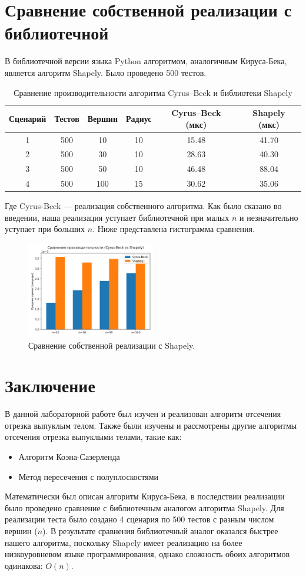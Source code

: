 \documentclass[areasetadvanced]{scrartcl}
\begin{document}
\section{Сравнение собственной реализации с библиотечной}
В библиотечной версии языка Python алгоритмом, аналогичным Кируса-Бека, является алгоритм Shapely. Было проведено 500 тестов. 
\begin{table}[h!]
    \centering
    \caption{Сравнение производительности алгоритма Cyrus–Beck и библиотеки Shapely}
    \label{tab:performance}
    \begin{tabular}{cccccc}
    \toprule
    Сценарий & Тестов & Вершин & Радиус & Cyrus–Beck (мкс) & Shapely (мкс) \\
    \midrule
    1 & 500 & 10  & 10 & 15.48 & 41.70 \\
    2 & 500 & 30  & 10 & 28.63 & 40.30 \\
    3 & 500 & 50  & 10 & 46.48 & 88.04 \\
    4 & 500 & 100 & 15 & 30.62 & 35.06 \\
    \bottomrule
    \end{tabular}
\end{table}
Где Cyrus-Beck — реализация собственного алгоритма. 
Как было сказано во введении, наша реализация уступает библиотечной при малых \(n\) и незначительно уступает при больших \(n\). 
Ниже представлена гистограмма сравнения.
\begin{figure}[H]
    \centering
    \includegraphics[width=0.5\textwidth]{../images/comparison_cyrus_vs_shapely.png}
    \caption{Сравнение собственной реализации с Shapely.}
    \label{fig:comparison}
\end{figure}
\newpage
\section*{Заключение}
В данной лабораторной работе был изучен и реализован алгоритм отсечения отрезка выпуклым телом. Также были изучены и рассмотрены другие алгоритмы отсечения отрезка выпуклыми телами, такие как:
\begin{itemize}
    \item Алгоритм Коэна-Сазерленда
    \item Метод пересечения с полуплоскостями
\end{itemize}
Математически был описан алгоритм Кируса-Бека, в последствии реализации было проведено сравнение с библиотечным аналогом алгоритма Shapely. Для реализации теста было создано 4 сценария по 500 тестов с разным числом вершин (\(n\)). В результате сравнения библиотечный аналог оказался быстрее нашего алгоритма, поскольку Shapely имеет реализацию на более низкоуровневом языке программирования, однако сложность обоих алгоритмов одинакова: \(O(n)\). 
\newpage
\end{document}

